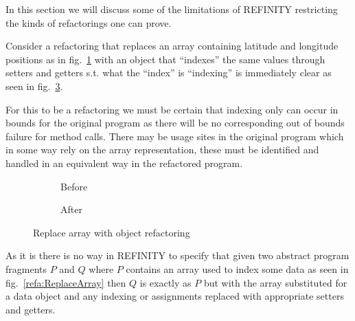 In this section we will discuss some of the limitations of REFINITY restricting the kinds of refactorings one can prove.

Consider a refactoring that replaces an array containing latitude and longitude positions as in fig.~\ref{refa:ReplaceArray-before} with an object that ``indexes'' the same values through setters and getters s.t. what the ``index'' is ``indexing'' is immediately clear as seen in fig.~\ref{refa:ReplaceArray-after}.

For this to be a refactoring we must be certain that indexing only can occur in bounds for the original program as there will be no corresponding out of bounds failure for method calls. There may be usage sites in the original program which in some way rely on the array representation, these must be identified and handled in an equivalent way in the refactored program.

\begin{figure}
      \label{refa:ReplaceArray}
  \begin{subfigure}[h]{.45\linewidth}
    \label{refa:ReplaceArray-before}    
    
    \caption{Before}
  \end{subfigure}\hspace{1cm}
  \begin{subfigure}[h]{.45\linewidth}
    \label{refa:ReplaceArray-after}
    
    \caption{After}
  \end{subfigure}
  \caption{Replace array with object refactoring}
\end{figure}

As it is there is no way in REFINITY to specify that given two abstract program fragments $P$ and $Q$ where $P$ contains
an array used to index some data as seen in fig.~\ref{refa:ReplaceArray} then $Q$ is exactly as $P$ but with
the array substituted for a data object and any indexing or assignments replaced with appropriate setters
and getters. 
